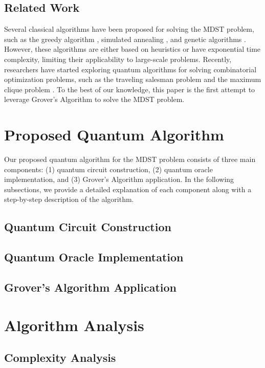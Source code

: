 \subsection{Related Work}
Several classical algorithms have been proposed for solving the MDST problem, such as the greedy algorithm \cite{greedy}, simulated annealing \cite{SA}, and genetic algorithms \cite{GA}. However, these algorithms are either based on heuristics or have exponential time complexity, limiting their applicability to large-scale problems. Recently, researchers have started exploring quantum algorithms for solving combinatorial optimization problems, such as the traveling salesman problem \cite{TSP} and the maximum clique problem \cite{MCP}. To the best of our knowledge, this paper is the first attempt to leverage Grover's Algorithm to solve the MDST problem.

\section{Proposed Quantum Algorithm}
\label{sec:algorithm}

Our proposed quantum algorithm for the MDST problem consists of three main components: (1) quantum circuit construction, (2) quantum oracle implementation, and (3) Grover's Algorithm application. In the following subsections, we provide a detailed explanation of each component along with a step-by-step description of the algorithm.

\subsection{Quantum Circuit Construction}

\subsection{Quantum Oracle Implementation}

\subsection{Grover's Algorithm Application}

\section{Algorithm Analysis}
\label{sec:analysis}

\subsection{Complexity Analysis}

